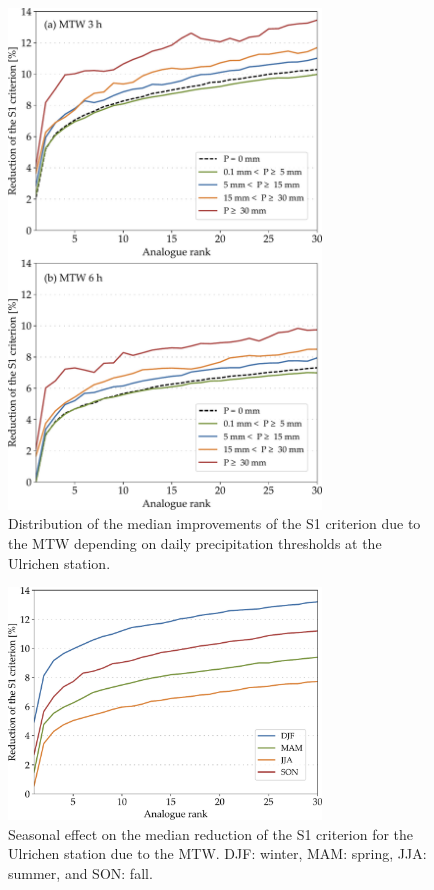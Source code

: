 \documentclass[hess, manuscript]{copernicus}
\begin{document}
	\begin{figure}[htb]
		\begin{center}
			\includegraphics[width=8.3cm]{fig07.pdf}
		\end{center}
		\caption{Distribution of the median improvements of the S1 criterion due to the MTW depending on daily precipitation thresholds at the Ulrichen station.}
		\label{fig:changes_S1_precip_threshold}
	\end{figure}
	
	\begin{figure}[htb]
		\begin{center}
			\includegraphics[width=8.3cm]{fig08.pdf}
		\end{center}
		\caption{Seasonal effect on the median reduction of the S1 criterion for the Ulrichen station due to the MTW. DJF: winter, MAM: spring, JJA: summer, and SON: fall.}
		\label{fig:changes_S1_seasons}
	\end{figure}
	
\end{document}
